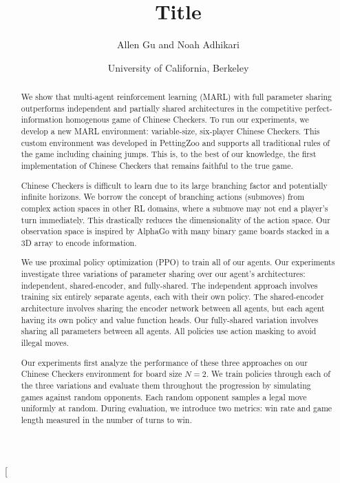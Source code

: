 \documentclass[12pt, a4paper, twocolumn]{article}
\title{Title}
\author{Allen Gu and Noah Adhikari}
\date{
    {\small University of California, Berkeley\\[2ex]} %
}
\begin{document}

\twocolumn[
  \begin{@twocolumnfalse}
    \maketitle
    
    \begin{abstract}
      We show that multi-agent reinforcement learning (MARL) with full parameter sharing outperforms independent and partially shared architectures in the competitive perfect-information homogenous game of Chinese Checkers. To run our experiments, we develop a new MARL environment: variable-size, six-player Chinese Checkers. This custom environment was developed in PettingZoo and supports all traditional rules of the game including chaining jumps. This is, to the best of our knowledge, the first implementation of Chinese Checkers that remains faithful to the true game.

      Chinese Checkers is difficult to learn due to its large branching factor and potentially infinite horizons. We borrow the concept of branching actions (submoves) from complex action spaces in other RL domains, where a submove may not end a player's turn immediately. This drastically reduces the dimensionality of the action space. Our observation space is inspired by AlphaGo with many binary game boards stacked in a 3D array to encode information.

      We use proximal policy optimization (PPO) to train all of our agents. Our experiments investigate three variations of parameter sharing over our agent's architectures: independent, shared-encoder, and fully-shared. The independent approach involves training six entirely separate agents, each with their own policy. The shared-encoder architecture involves sharing the encoder network between all agents, but each agent having its own policy and value function heads. Our fully-shared variation involves sharing all parameters between all agents. All policies use action masking to avoid illegal moves.

      Our experiments first analyze the performance of these three approaches on our Chinese Checkers environment for board size $N = 2$. We train policies through each of the three variations and evaluate them throughout the progression by simulating games against random opponents. Each random opponent samples a legal move uniformly at random. During evaluation, we introduce two metrics: win rate and game length measured in the number of turns to win.


\end{abstract}
\end{@twocolumnfalse}
\end{document}
